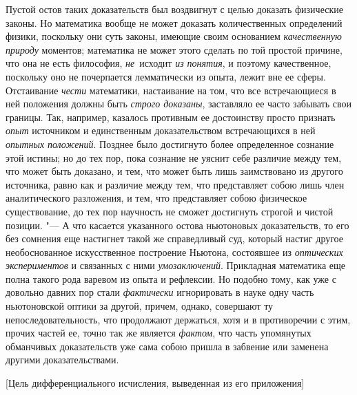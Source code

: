 Пустой остов таких доказательств был воздвигнут с целью доказать физические
законы. Но математика вообще не может доказать количественных определений
физики, поскольку они суть законы, имеющие своим основанием {\em качественную
природу} моментов; математика не может этого сделать по той простой причине,
что она не есть философия, {\em не}~исходит {\em из понятия}, и поэтому
качественное, поскольку оно не почерпается лемматически из опыта, лежит вне ее
сферы. Отстаивание {\em чести} математики, настаивание на том, что все
встречающиеся в ней положения должны быть {\em строго доказаны}, заставляло ее
часто забывать свои границы. Так, например, казалось противным ее достоинству
просто признать {\em опыт} источником и единственным доказательством
встречающихся в ней {\em опытных }{\em положений}. Позднее было достигнуто
более определенное сознание этой истины; но до тех пор, пока сознание не уяснит
себе различие между тем, что может быть доказано, и тем, что может быть лишь
заимствовано из другого источника, равно как и различие между тем, что
представляет собою лишь член аналитического разложения, и тем, что представляет
собою физическое существование, до тех пор научность не сможет достигнуть
строгой и чистой позиции. "--- А что касается указанного остова ньютоновых
доказательств, то его без сомнения еще настигнет такой же справедливый суд,
который настиг другое необоснованное искусственное построение Ньютона,
состоявшее из {\em оптических экспериментов} и связанных с ними
{\em умозаключений}. Прикладная математика еще полна такого рода варевом из
опыта и рефлексии. Но подобно тому, как уже с довольно давних пор стали
{\em фактически} игнорировать в науке одну часть ньютоновской оптики за другой,
причем, однако, совершают ту непоследовательность, что продолжают держаться,
хотя и в противоречии с этим, прочих частей ее, точно так же является
{\em фактом}, что часть упомянутых обманчивых доказательств уже сама собою
пришла в забвение или заменена другими доказательствами.

%
{[Цель дифференциального исчисления, выведенная из его приложения]}

